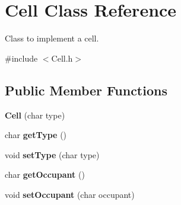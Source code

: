 \hypertarget{classCell}{}\section{Cell Class Reference}
\label{classCell}


Class to implement a cell.  




{\ttfamily \#include $<$Cell.\+h$>$}

\subsection*{Public Member Functions}
\begin{DoxyCompactItemize}
\item 
\hypertarget{classCell_aec0c2aa388ac3630108ab00cb5d0b723}{}\label{classCell_aec0c2aa388ac3630108ab00cb5d0b723} 
{\bfseries Cell} (char type)
\item 
\hypertarget{classCell_a92fc16bdcc26c2678122588898c5b84f}{}\label{classCell_a92fc16bdcc26c2678122588898c5b84f} 
char {\bfseries get\+Type} ()
\item 
\hypertarget{classCell_aec50a5f39f77075f0dea7e0abbea2827}{}\label{classCell_aec50a5f39f77075f0dea7e0abbea2827} 
void {\bfseries set\+Type} (char type)
\item 
\hypertarget{classCell_a730bbea4297eb0c7f2d943f75375f506}{}\label{classCell_a730bbea4297eb0c7f2d943f75375f506} 
char {\bfseries get\+Occupant} ()
\item 
\hypertarget{classCell_a782d9ced9f1345fafb5eb0feb04189a6}{}\label{classCell_a782d9ced9f1345fafb5eb0feb04189a6} 
void {\bfseries set\+Occupant} (char occupant)
\end{DoxyCompactItemize}
